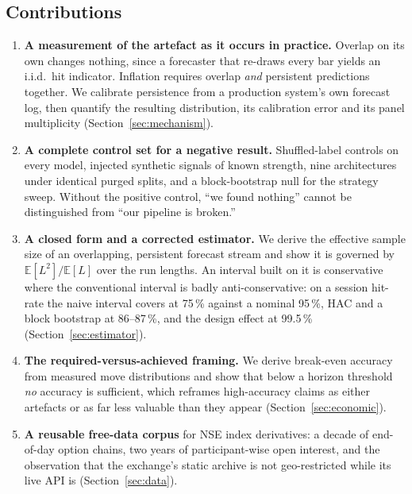 \documentclass[conference]{IEEEtran}
\begin{document}
\subsection{Contributions}

\begin{enumerate}
\item \textbf{A measurement of the artefact as it occurs in practice.} Overlap
on its own changes nothing, since a forecaster that re-draws every bar yields an
i.i.d.\ hit indicator. Inflation requires overlap \emph{and} persistent
predictions together. We calibrate persistence from a production system's own
forecast log, then quantify the resulting distribution, its calibration error
and its panel multiplicity (Section~\ref{sec:mechanism}).

\item \textbf{A complete control set for a negative result.} Shuffled-label
controls on every model, injected synthetic signals of known strength, nine
architectures under identical purged splits, and a block-bootstrap null for the
strategy sweep. Without the positive control, ``we found nothing'' cannot be
distinguished from ``our pipeline is broken.''

\item \textbf{A closed form and a corrected estimator.} We derive the
effective sample size of an overlapping, persistent forecast stream and show it
is governed by $\mathbb{E}[L^2]/\mathbb{E}[L]$ over the run lengths. An interval
built on it is conservative where the conventional interval is badly
anti-conservative: on a session hit-rate the naive interval covers at 75\,\%
against a nominal 95\,\%, HAC and a block bootstrap at 86--87\,\%, and the design
effect at 99.5\,\% (Section~\ref{sec:estimator}).

\item \textbf{The required-versus-achieved framing.} We derive break-even
accuracy from measured move distributions and show that below a horizon
threshold \emph{no} accuracy is sufficient, which reframes high-accuracy claims
as either artefacts or as far less valuable than they appear
(Section~\ref{sec:economic}).

\item \textbf{A reusable free-data corpus} for NSE index derivatives: a decade
of end-of-day option chains, two years of participant-wise open interest, and
the observation that the exchange's static archive is not geo-restricted while
its live API is (Section~\ref{sec:data}).
\end{enumerate}
\end{document}
